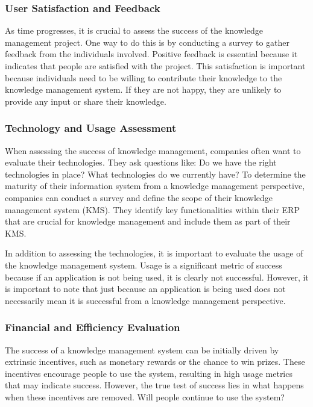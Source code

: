 \subsubsection{User Satisfaction and
  Feedback}\label{user-satisfaction-and-feedback}

As time progresses, it is crucial to assess the success of the knowledge
management project. One way to do this is by conducting a survey to
gather feedback from the individuals involved. Positive feedback is
essential because it indicates that people are satisfied with the
project. This satisfaction is important because individuals need to be
willing to contribute their knowledge to the knowledge management
system. If they are not happy, they are unlikely to provide any input or
share their knowledge.

\subsubsection{Technology and Usage
  Assessment}\label{technology-and-usage-assessment}

When assessing the success of knowledge management, companies often want
to evaluate their technologies. They ask questions like: Do we have the
right technologies in place? What technologies do we currently have? To
determine the maturity of their information system from a knowledge
management perspective, companies can conduct a survey and define the
scope of their knowledge management system (KMS). They identify key
functionalities within their ERP that are crucial for knowledge
management and include them as part of their KMS.

In addition to assessing the technologies, it is important to evaluate
the usage of the knowledge management system. Usage is a significant
metric of success because if an application is not being used, it is
clearly not successful. However, it is important to note that just
because an application is being used does not necessarily mean it is
successful from a knowledge management perspective.

\subsubsection{Financial and Efficiency
  Evaluation}\label{financial-and-efficiency-evaluation}

The success of a knowledge management system can be initially driven by
extrinsic incentives, such as monetary rewards or the chance to win
prizes. These incentives encourage people to use the system, resulting
in high usage metrics that may indicate success. However, the true test
of success lies in what happens when these incentives are removed. Will
people continue to use the system?

